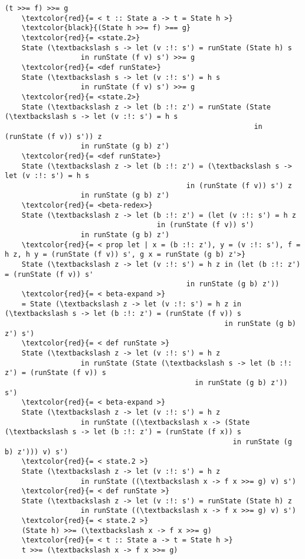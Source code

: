 \documentclass[11pt]{article}
\begin{document}
\begin{Verbatim}[commandchars=\\\{\}] 
    (t >>= f) >>= g
    \textcolor{red}{= < t :: State a -> t = State h >}
    \textcolor{black}{(State h >>= f) >== g}
    \textcolor{red}{= <state.2>}
    State (\textbackslash s -> let (v :!: s') = runState (State h) s
                  in runState (f v) s') >>= g
    \textcolor{red}{= <def runState>}
    State (\textbackslash s -> let (v :!: s') = h s 
                  in runState (f v) s') >>= g
    \textcolor{red}{= <state.2>}
    State (\textbackslash z -> let (b :!: z') = runState (State (\textbackslash s -> let (v :!: s') = h s
                                                           in (runState (f v)) s')) z
                  in runState (g b) z')
    \textcolor{red}{= <def runState>}
    State (\textbackslash z -> let (b :!: z') = (\textbackslash s -> let (v :!: s') = h s 
                                           in (runState (f v)) s') z
                  in runState (g b) z')
    \textcolor{red}{= <beta-redex>}
    State (\textbackslash z -> let (b :!: z') = (let (v :!: s') = h z 
                                    in (runState (f v)) s')
                  in runState (g b) z')
    \textcolor{red}{= < prop let | x = (b :!: z'), y = (v :!: s'), f = h z, h y = (runState (f v)) s', g x = runState (g b) z'>}
    State (\textbackslash z -> let (v :!: s') = h z in (let (b :!: z') = (runState (f v)) s' 
                                           in runState (g b) z'))
    \textcolor{red}{= < beta-expand >}
    = State (\textbackslash z -> let (v :!: s') = h z in (\textbackslash s -> let (b :!: z') = (runState (f v)) s
                                                    in runState (g b) z') s')
    \textcolor{red}{= < def runState >}
    State (\textbackslash z -> let (v :!: s') = h z 
                  in runState (State (\textbackslash s -> let (b :!: z') = (runState (f v)) s
                                             in runState (g b) z')) s')
    \textcolor{red}{= < beta-expand >}
    State (\textbackslash z -> let (v :!: s') = h z 
                  in runState ((\textbackslash x -> (State (\textbackslash s -> let (b :!: z') = (runState (f x)) s
                                                      in runState (g b) z'))) v) s')
    \textcolor{red}{= < state.2 >}
    State (\textbackslash z -> let (v :!: s') = h z 
                  in runState ((\textbackslash x -> f x >>= g) v) s')
    \textcolor{red}{= < def runState >}
    State (\textbackslash z -> let (v :!: s') = runState (State h) z 
                  in runState ((\textbackslash x -> f x >>= g) v) s')
    \textcolor{red}{= < state.2 >}
    (State h) >>= (\textbackslash x -> f x >>= g)
    \textcolor{red}{= < t :: State a -> t = State h >}
    t >>= (\textbackslash x -> f x >>= g)
\end{Verbatim}
\end{document}
